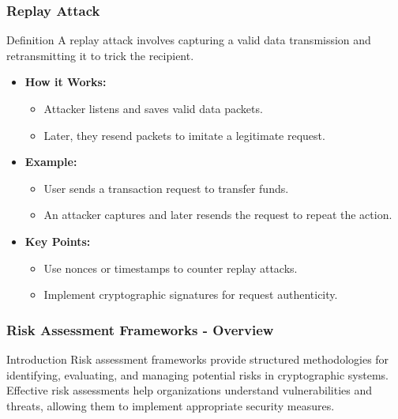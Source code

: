 \documentclass{beamer}
\begin{document}
\begin{frame}[fragile]
    \frametitle{Replay Attack}
    
    \begin{block}{Definition}
        A replay attack involves capturing a valid data transmission and retransmitting it to trick the recipient.
    \end{block}
    
    \begin{itemize}
        \item \textbf{How it Works:}
            \begin{itemize}
                \item Attacker listens and saves valid data packets.
                \item Later, they resend packets to imitate a legitimate request.
            \end{itemize}
        \item \textbf{Example:}
            \begin{itemize}
                \item User sends a transaction request to transfer funds.
                \item An attacker captures and later resends the request to repeat the action.
            \end{itemize}
        \item \textbf{Key Points:}
            \begin{itemize}
                \item Use nonces or timestamps to counter replay attacks.
                \item Implement cryptographic signatures for request authenticity.
            \end{itemize}
    \end{itemize}
\end{frame}

\begin{frame}[fragile]
    \frametitle{Risk Assessment Frameworks - Overview}
    \begin{block}{Introduction}
    Risk assessment frameworks provide structured methodologies for identifying, evaluating, and managing potential risks in cryptographic systems. Effective risk assessments help organizations understand vulnerabilities and threats, allowing them to implement appropriate security measures.
    \end{block}
\end{frame}
\end{document}
